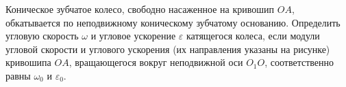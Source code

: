 Коническое зубчатое колесо, свободно насаженное на кривошип $OA$,
обкатывается по неподвижному коническому зубчатому основанию.
Определить угловую скорость $\omega$ и угловое ускорение $\varepsilon$
катящегося колеса, если модули угловой скорости и углового ускорения
(их направления указаны на рисунке) кривошипа $OA$,
вращающегося вокруг неподвижной оси $O_1O$, соответственно равны
$\omega _0$ и $\varepsilon _0$.
